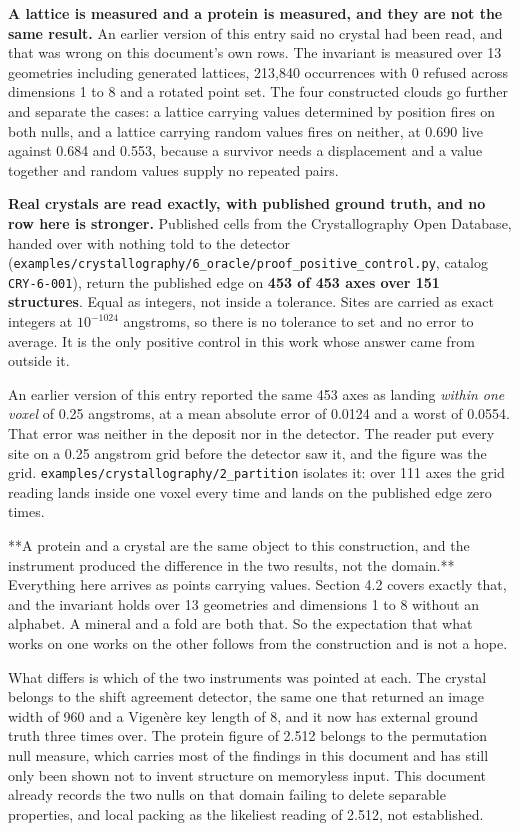 \textbf{A lattice is measured and a protein is measured, and they are not the same result.} An earlier version of this entry said no crystal had been read, and that was wrong on this document's own rows. The invariant is measured over 13 geometries including generated lattices, 213,840 occurrences with 0 refused across dimensions 1 to 8 and a rotated point set. The four constructed clouds go further and separate the cases: a lattice carrying values determined by position fires on both nulls, and a lattice carrying random values fires on neither, at 0.690 live against 0.684 and 0.553, because a survivor needs a displacement and a value together and random values supply no repeated pairs.

\textbf{Real crystals are read exactly, with published ground truth, and no row here is stronger.} Published cells from the Crystallography Open Database, handed over with nothing told to the detector (\texttt{examples/\allowbreak{}crystallography/\allowbreak{}6\_\allowbreak{}oracle/\allowbreak{}proof\_\allowbreak{}positive\_\allowbreak{}control.\allowbreak{}py}, catalog \texttt{CRY-6-001}), return the published edge on \textbf{453 of 453 axes over 151 structures}. Equal as integers, not inside a tolerance. Sites are carried as exact integers at $10^{-1024}$ angstroms, so there is no tolerance to set and no error to average. It is the only positive control in this work whose answer came from outside it.

An earlier version of this entry reported the same 453 axes as landing \emph{within one voxel} of 0.25 angstroms, at a mean absolute error of 0.0124 and a worst of 0.0554. That error was neither in the deposit nor in the detector. The reader put every site on a 0.25 angstrom grid before the detector saw it, and the figure was the grid. \texttt{examples/\allowbreak{}crystallography/\allowbreak{}2\_\allowbreak{}partition} isolates it: over 111 axes the grid reading lands inside one voxel every time and lands on the published edge zero times.

**A protein and a crystal are the same object to this construction, and the instrument produced the difference in the two results, not the domain.** Everything here arrives as points carrying values. Section 4.2 covers exactly that, and the invariant holds over 13 geometries and dimensions 1 to 8 without an alphabet. A mineral and a fold are both that. So the expectation that what works on one works on the other follows from the construction and is not a hope.

What differs is which of the two instruments was pointed at each. The crystal belongs to the shift agreement detector, the same one that returned an image width of 960 and a Vigenère key length of 8, and it now has external ground truth three times over. The protein figure of 2.512 belongs to the permutation null measure, which carries most of the findings in this document and has still only been shown not to invent structure on memoryless input. This document already records the two nulls on that domain failing to delete separable properties, and local packing as the likeliest reading of 2.512, not established.

